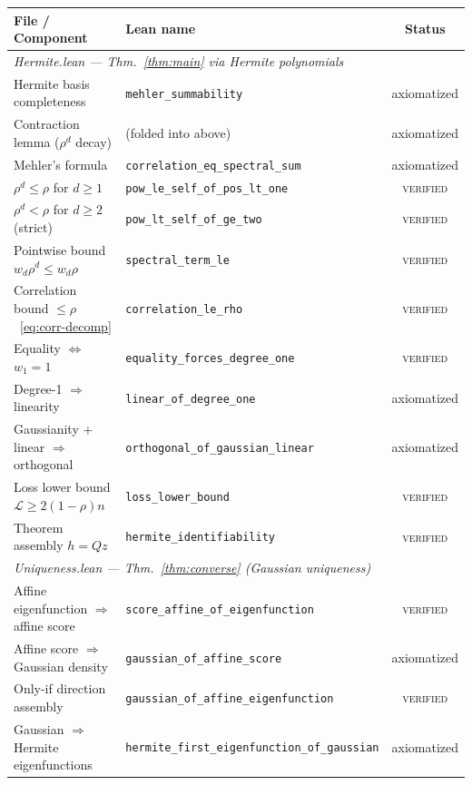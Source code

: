 \begin{table}[h]
\centering
\small
\renewcommand{\arraystretch}{1.15}
\begin{tabular}{llc}
\toprule
\textbf{File / Component} & \textbf{Lean name} & \textbf{Status} \\
\midrule
\multicolumn{3}{l}{\textit{Hermite.lean --- Thm.~\ref{thm:main} via Hermite polynomials}} \\
Hermite basis completeness & \texttt{mehler\_summability} & axiomatized \\
Contraction lemma ($\rho^d$ decay) & (folded into above) & axiomatized \\
Mehler's formula & \texttt{correlation\_eq\_spectral\_sum} & axiomatized \\
$\rho^d \leq \rho$ for $d \geq 1$ & \texttt{pow\_le\_self\_of\_pos\_lt\_one} & \textsc{verified} \\
$\rho^d < \rho$ for $d \geq 2$ (strict) & \texttt{pow\_lt\_self\_of\_ge\_two} & \textsc{verified} \\
Pointwise bound $w_d \rho^d \leq w_d \rho$ & \texttt{spectral\_term\_le} & \textsc{verified} \\
Correlation bound $\leq \rho$~\eqref{eq:corr-decomp} & \texttt{correlation\_le\_rho} & \textsc{verified} \\
Equality $\Leftrightarrow$ $w_1 = 1$ & \texttt{equality\_forces\_degree\_one} & \textsc{verified} \\
Degree-1 $\Rightarrow$ linearity & \texttt{linear\_of\_degree\_one} & axiomatized \\
Gaussianity + linear $\Rightarrow$ orthogonal & \texttt{orthogonal\_of\_gaussian\_linear} & axiomatized \\
Loss lower bound $\mathcal{L} \geq 2(1-\rho)n$ & \texttt{loss\_lower\_bound} & \textsc{verified} \\
Theorem assembly $h = Qz$ & \texttt{hermite\_identifiability} & \textsc{verified} \\
\midrule
\multicolumn{3}{l}{\textit{Uniqueness.lean --- Thm.~\ref{thm:converse} (Gaussian uniqueness)}} \\
Affine eigenfunction $\Rightarrow$ affine score & \texttt{score\_affine\_of\_eigenfunction} & \textsc{verified} \\
Affine score $\Rightarrow$ Gaussian density & \texttt{gaussian\_of\_affine\_score} & axiomatized \\
Only-if direction assembly & \texttt{gaussian\_of\_affine\_eigenfunction} & \textsc{verified} \\
Gaussian $\Rightarrow$ Hermite eigenfunctions & \texttt{hermite\_first\_eigenfunction\_of\_gaussian} & axiomatized \\

\end{tabular}
\end{table}
